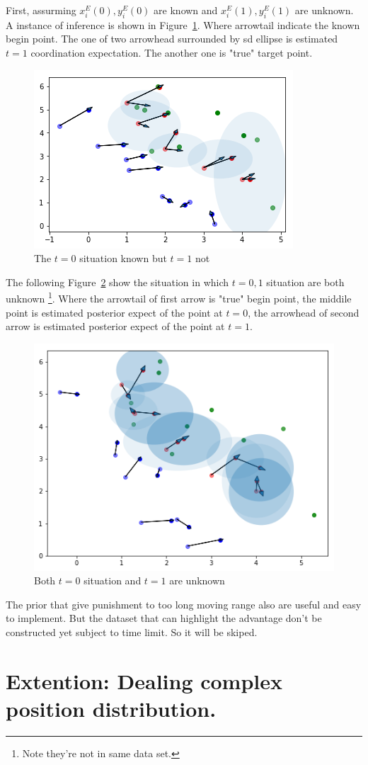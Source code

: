 \documentclass{article}
\begin{document}
First, assurming $x^E_i(0),y^E_i(0)$ are known and $x^E_i(1),y^E_i(1)$ are unknown.
A instance of inference is shown in Figure~\ref{fig:bkeu}. 
Where arrowtail indicate the known begin point.
The one of two arrowhead surrounded by sd ellipse is estimated $t=1$ coordination expectation. 
The another one is "true" target point.

\begin{figure}[h]
\includegraphics[width=0.4\linewidth]{bkeu.png}
\caption{The $t=0$ situation known but $t=1$ not}
\label{fig:bkeu}
\end{figure}

The following Figure~\ref{fig:bueu} show the situation in which $t=0,1$ situation are both unknown
\footnote{Note they're not in same data set.}. Where the arrowtail of first arrow is "true" begin
point, the middile point is estimated posterior expect of the point at $t=0$, the arrowhead of second arrow
is estimated posterior expect of the point at $t=1$.

\begin{figure}[h]
\includegraphics[width=0.6\linewidth]{bueu.png}
\caption{Both $t=0$ situation and $t=1$ are unknown}
\label{fig:bueu}
\end{figure}

The prior that give punishment to too long moving range also are useful and easy to implement. 
But the dataset that can highlight the advantage don't be constructed yet subject to time limit.
So it will be skiped.

\section{Extention: Dealing complex position distribution.}
\end{document}
